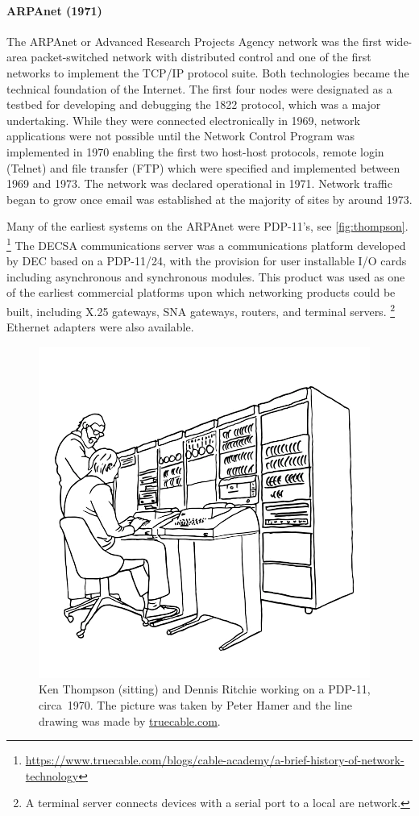 {\paragraph{ARPAnet (1971)}
The ARPAnet or Advanced Research Projects Agency network was the first wide-area packet-switched network with distributed control and one of the first networks to implement the TCP/IP protocol suite.
Both technologies became the technical foundation of the Internet.
The first four nodes were designated as a testbed for developing and debugging the 1822 protocol, which was a major undertaking.
While they were connected electronically in 1969, network applications were not possible until the Network Control Program was implemented in 1970 enabling the first two host-host protocols, remote login (Telnet) and file transfer (FTP) which were specified and implemented between 1969 and 1973.
The network was declared operational in 1971.
Network traffic began to grow once email was established at the majority of sites by around 1973.

Many of the earliest systems on the ARPAnet were PDP-11's, see \vref{fig:thompson}.%
\footnote{\href{https://www.truecable.com/blogs/cable-academy/a-brief-history-of-network-technology}{https://www.truecable.com/blogs/cable-academy/a-brief-history-of-network-technology}}
The DECSA communications server was a communications platform developed by DEC based on a PDP-11/24, with the provision for user installable I/O cards including asynchronous and synchronous modules.
This product was used as one of the earliest commercial platforms upon which networking products could be built, including X.25 gateways, SNA gateways, routers, and terminal servers.%
\footnote{A terminal server connects devices with a serial port to a local are network.}
Ethernet adapters were also available.

\begin{figure}
\centering
\includegraphics[width=.5\textwidth]{images/thompson.png}
\caption{Ken Thompson (sitting) and Dennis Ritchie working on a PDP-11, circa~1970. The picture was taken by Peter Hamer and the line drawing was made by \href{https://www.truecable.com/blogs/cable-academy/a-brief-history-of-network-technology}{truecable.com}.}
\label{fig:thompson}
\end{figure}

}
